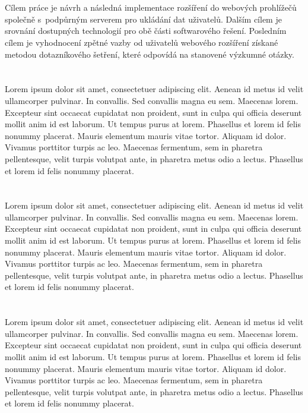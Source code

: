 \section*{\CilPrace}
Cílem práce je návrh a následná implementace rozšíření do webových prohlížečů společně s~podpůrným serverem pro ukládání dat uživatelů. Dalším cílem je srovnání dostupných technologií pro obě části softwarového řešení. Posledním cílem je vyhodnocení zpětné vazby od uživatelů webového rozšíření získané metodou dotazníkového šetření, které odpovídá na stanovené výzkumné otázky.

\section*{\PouziteMetody}
Lorem ipsum dolor sit amet, consectetuer adipiscing elit. Aenean id metus id velit ullamcorper pulvinar. In convallis. Sed convallis magna eu sem. Maecenas lorem. Excepteur sint occaecat cupidatat non proident, sunt in culpa qui officia deserunt mollit anim id est laborum. Ut tempus purus at lorem. Phasellus et lorem id felis nonummy placerat. Mauris elementum mauris vitae tortor. Aliquam id dolor. Vivamus porttitor turpis ac leo. Maecenas fermentum, sem in pharetra pellentesque, velit turpis volutpat ante, in pharetra metus odio a lectus. Phasellus et lorem id felis nonummy placerat.

\section*{\Vysledky}
Lorem ipsum dolor sit amet, consectetuer adipiscing elit. Aenean id metus id velit ullamcorper pulvinar. In convallis. Sed convallis magna eu sem. Maecenas lorem. Excepteur sint occaecat cupidatat non proident, sunt in culpa qui officia deserunt mollit anim id est laborum. Ut tempus purus at lorem. Phasellus et lorem id felis nonummy placerat. Mauris elementum mauris vitae tortor. Aliquam id dolor. Vivamus porttitor turpis ac leo. Maecenas fermentum, sem in pharetra pellentesque, velit turpis volutpat ante, in pharetra metus odio a lectus. Phasellus et lorem id felis nonummy placerat.

\section*{\PrinosAutora}
Lorem ipsum dolor sit amet, consectetuer adipiscing elit. Aenean id metus id velit ullamcorper pulvinar. In convallis. Sed convallis magna eu sem. Maecenas lorem. Excepteur sint occaecat cupidatat non proident, sunt in culpa qui officia deserunt mollit anim id est laborum. Ut tempus purus at lorem. Phasellus et lorem id felis nonummy placerat. Mauris elementum mauris vitae tortor. Aliquam id dolor. Vivamus porttitor turpis ac leo. Maecenas fermentum, sem in pharetra pellentesque, velit turpis volutpat ante, in pharetra metus odio a lectus. Phasellus et lorem id felis nonummy placerat.
